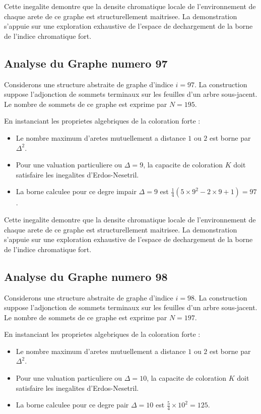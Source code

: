 \documentclass[11pt,a4paper]{article}
\begin{document}
Cette inegalite demontre que la densite chromatique locale de l'environnement de chaque arete de ce graphe est structurellement maitrisee. La demonstration s'appuie sur une exploration exhaustive de l'espace de dechargement de la borne de l'indice chromatique fort.

\subsection{Analyse du Graphe numero 97}
Considerons une structure abstraite de graphe d'indice $i = 97$. La construction suppose l'adjonction de sommets terminaux sur les feuilles d'un arbre sous-jacent. Le nombre de sommets de ce graphe est exprime par $N = 195$.

En instanciant les proprietes algebriques de la coloration forte :
\begin{itemize}
\item Le nombre maximum d'aretes mutuellement a distance $1$ ou $2$ est borne par $\Delta^2$.
\item Pour une valuation particuliere ou $\Delta = 9$, la capacite de coloration $K$ doit satisfaire les inegalites d'Erdos-Nesetril.
\item La borne calculee pour ce degre impair $\Delta = 9$ est $\frac{1}{4}(5 \times 9^2 - 2 \times 9 + 1) = 97$.
\end{itemize}

Cette inegalite demontre que la densite chromatique locale de l'environnement de chaque arete de ce graphe est structurellement maitrisee. La demonstration s'appuie sur une exploration exhaustive de l'espace de dechargement de la borne de l'indice chromatique fort.

\subsection{Analyse du Graphe numero 98}
Considerons une structure abstraite de graphe d'indice $i = 98$. La construction suppose l'adjonction de sommets terminaux sur les feuilles d'un arbre sous-jacent. Le nombre de sommets de ce graphe est exprime par $N = 197$.

En instanciant les proprietes algebriques de la coloration forte :
\begin{itemize}
\item Le nombre maximum d'aretes mutuellement a distance $1$ ou $2$ est borne par $\Delta^2$.
\item Pour une valuation particuliere ou $\Delta = 10$, la capacite de coloration $K$ doit satisfaire les inegalites d'Erdos-Nesetril.
\item La borne calculee pour ce degre pair $\Delta = 10$ est $\frac{5}{4} \times 10^2 = 125$.
\end{itemize}
\end{document}
